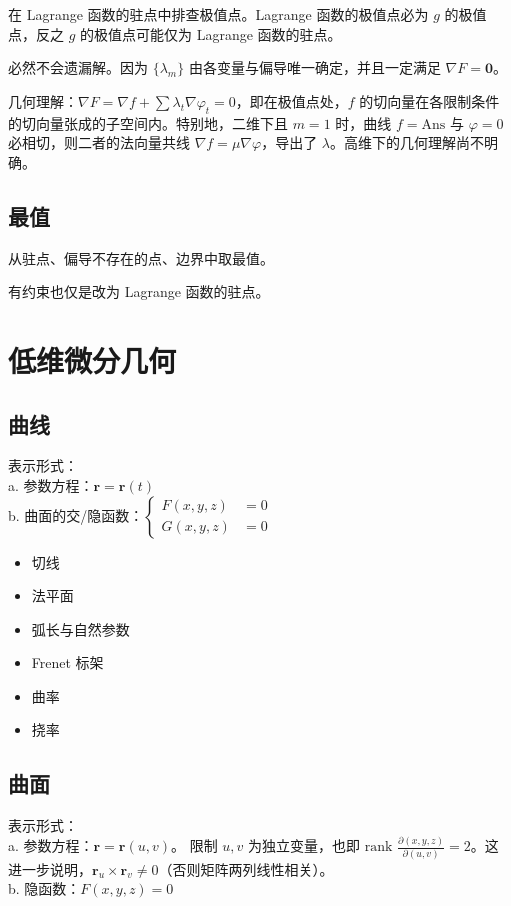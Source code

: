 \documentclass[12pt, a4paper, UTF8, openany]{ctexbook}
\newcommand{\mat}[1]{\mathbf{#1}}
\begin{document}
        在 Lagrange 函数的{\heiti 驻点}中排查极值点。Lagrange 函数的极值点必为 $g$ 的极值点，反之 $g$ 的极值点可能仅为 Lagrange 函数的驻点。

        必然不会遗漏解。因为 $\{\lambda_m\}$ 由各变量与偏导唯一确定，并且一定满足 $\nabla F = \mat{0}$。

        几何理解：$\nabla F = \nabla f + \sum \lambda_t \nabla \varphi_t = 0$，即在极值点处，$f$ 的切向量在各限制条件的切向量张成的子空间内。特别地，二维下且 $m = 1$ 时，曲线 $f = \text{Ans}$ 与 $\varphi = 0$ 必相切，则二者的法向量共线 $\nabla f = \mu \nabla \varphi$，导出了 $\lambda$。高维下的几何理解尚不明确。

        \subsection{最值}
        从驻点、偏导不存在的点、边界中取最值。

        有约束也仅是改为 Lagrange 函数的驻点。

    \section{低维微分几何}
        \subsection{曲线}
        表示形式：\\
        a. 参数方程：$\mat{r} = \mat{r}(t)$ \\
        b. 曲面的交/隐函数：$\begin{cases}
            F(x, y, z) &= 0 \\
            G(x, y, z) &= 0
        \end{cases}$

        \begin{itemize}
            \item 切线
            \item 法平面
            \item 弧长与自然参数
            \item Frenet 标架
            \item 曲率
            \item 挠率
        \end{itemize}

        \subsection{曲面}
        表示形式：\\
        a. 参数方程：$\mat{r} = \mat{r}(u, v)$。
        限制 $u, v$ 为独立变量，也即 $\text{rank } \frac{\partial (x, y, z)}{\partial (u, v)} = 2$。这进一步说明，$\mat{r}_u \times \mat{r}_v \neq 0$（否则矩阵两列线性相关）。\\
        b. 隐函数：$F(x, y, z) = 0$
\end{document}
